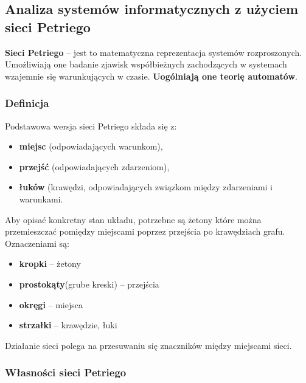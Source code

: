 \subsection{Analiza systemów informatycznych z użyciem sieci Petriego}

\textbf{Sieci Petriego} – jest to matematyczna reprezentacja systemów rozproszonych. Umożliwiają one badanie zjawisk współbieżnych zachodzących w systemach wzajemnie się warunkujących w czasie. \textbf{Uogólniają one teorię automatów}.

\subsubsection{Definicja}

Podstawowa wersja sieci Petriego składa się z:

\begin{itemize}
	\item \textbf{miejsc} (odpowiadających warunkom),
	\item \textbf{przejść} (odpowiadających zdarzeniom),
	\item \textbf{łuków} (krawędzi, odpowiadających związkom między zdarzeniami i warunkami. \\
\end{itemize}

Aby opisać konkretny stan układu, potrzebne są żetony które można przemieszczać pomiędzy miejscami poprzez przejścia po krawędziach grafu. Oznaczeniami są:

\begin{itemize}
	\item \textbf{kropki} – żetony
	\item \textbf{prostokąty}(grube kreski) – przejścia
	\item \textbf{okręgi} – miejsca
	\item \textbf{strzałki} – krawędzie, łuki \\

\end{itemize}

Działanie sieci polega na przesuwaniu się znaczników między miejscami sieci.

\subsubsection{Własności sieci Petriego}


